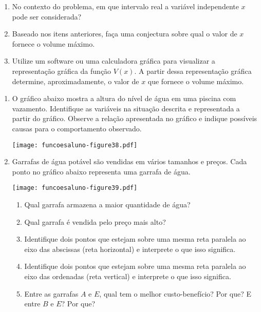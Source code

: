 \documentclass[extrafontsizes, twoside, 11pt, openright, final]{memoir}
\begin{document}
\begin{project}
\begin{enumerate}
		\item No contexto do problema, em que intervalo real a variável independente $x$ pode ser considerada?

		\item Baseado nos itens anteriores, faça uma conjectura sobre qual o valor de $x$ fornece o volume máximo.

		\item Utilize um software ou uma calculadora gráfica para visualizar a representação gráfica da função $V(x)$. A partir dessa representação gráfica determine, aproximadamente, o valor de $x$ que fornece o volume máximo.

	\end{enumerate}
\end{project}

\exercise


\label{\detokenize{AF106-E2:sec-exercicios-grafico}}\label{\detokenize{AF106-E2:exercicios}}\label{\detokenize{AF106-E2::doc}}

\begin{enumerate}
	\item O gráfico abaixo mostra a altura do nível de água em uma piscina com vazamento. Identifique as variáveis na situação descrita e representada a partir do gráfico. Observe a relação apresentada no gráfico e indique possíveis causas para o comportamento observado.
	      \begin{center}
		      \texttt{[image: funcoesaluno-figure38.pdf]}
	      \end{center}

	\item Garrafas de água potável são vendidas em vários tamanhos e preços. Cada ponto no gráfico abaixo representa uma garrafa de água.
	      \begin{center}
		      \texttt{[image: funcoesaluno-figure39.pdf]}
	      \end{center}\begin{enumerate}
		      \item       Qual garrafa armazena a maior quantidade de água?

		      \item       Qual garrafa é vendida pelo preço mais alto?

		      \item       Identifique dois pontos que estejam sobre uma mesma reta paralela ao eixo das abscissas (reta horizontal) e interprete o que isso significa.

		      \item       Identifique dois pontos que estejam sobre uma mesma reta paralela ao eixo das ordenadas (reta vertical) e interprete o que isso significa.

		      \item       Entre as garrafas $A$ e $E$, qual tem o melhor custo-benefício? Por que? E entre $B$ e $E$? Por que?

	      \end{enumerate}
\end{enumerate}
\end{document}

